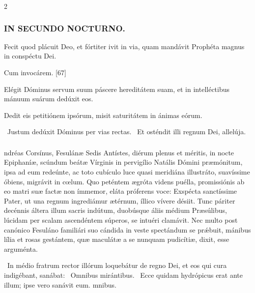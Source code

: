 \documentclass[9pt,twoside]{extarticle}
\begin{document}
\begin{multicols}{2}
\subsubsection*{\center \textsc{IN SECUNDO NOCTURNO.}}
\begin{tightlist}{}
\item {} Fecit quod plácuit Deo, et fórtiter ivit in via, quam mandávit Prophéta magnus in conspéctu Dei.
\item {} Cum invocárem. [67]
\item {} Elégit Dóminus servum suum páscere hereditátem suam, et in intelléctibus mánuum suárum dedúxit eos.
\item {} Dedit eis petitiónem ipsórum, misit saturitátem in ánimas eórum.
\item {}~Justum dedúxit Dóminus per vias rectas. ~Et osténdit illi regnum Dei, allelúja.
\end{tightlist}

\subsubsection*{\center {}}
ndréas Corsínus, Fesulánæ Sedis Antístes, diérum plenus et méritis, in nocte Epiphaníæ, scúndum beátæ Vírginis in pervigílio Natális Dómini præmónitum, ipsa ad eum redeúnte, ac toto cubículo luce quasi meridiána illustráto, suavíssime óbiens, migrávit in cœlum. Quo peténtem ægróta videns puélla, promissiónis ab eo matri suæ factæ non ímmemor, eláta próferens voce: Exspécta sanctíssime Pater, ut una regnum ingrediámur ætérnum, íllico vívere désiit. Tunc páriter decénnis áltera illum sacris indútum, duobúsque áliis médium Præsúlibus, lúcidam per scalam ascendéntem súperos, se intuéri clamávit. Nec multo post canónico Fesuláno familiári suo cándida in veste spectándum se prǽbuit, mánibus lília et rosas gestántem, quæ maculátæ a se nunquam pudicítiæ, dixit, esse arguménta.

\begin{tightlist}{}
\item {}~In médio fratrum rector illórum loquebátur de regno Dei, et eos qui cura indigébant, sanábat: \textred{*}~Omnibus mirántibus. ~Ecce quidam hydrópicus erat ante illum; ipse vero sanávit eum. mnibus.
\end{tightlist}


\end{multicols}
\end{document}
